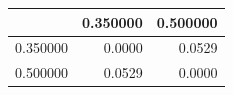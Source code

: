 \begin{tabular}{lrr}
\toprule
 & 0.350000 & 0.500000 \\
\midrule
0.350000 & 0.0000 & 0.0529 \\
0.500000 & 0.0529 & 0.0000 \\
\bottomrule
\end{tabular}

